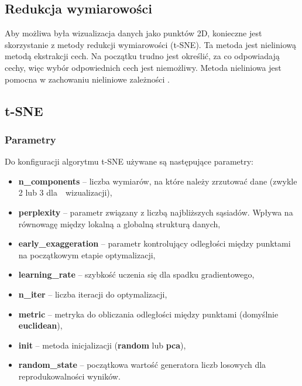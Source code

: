 	\subsection{Redukcja wymiarowości}
		Aby możliwa była wizualizacja danych jako punktów 2D, konieczne jest skorzystanie z metody redukcji wymiarowości (t-SNE). Ta metoda jest nieliniową metodą ekstrakcji cech. Na początku trudno jest określić, za co odpowiadają cechy, więc wybór odpowiednich cech jest niemożliwy. Metoda nieliniowa jest pomocna w  zachowaniu nieliniowe zależności \cite{t-sne}.
	
		
	\subsection{t-SNE}
	
		\subsubsection{Parametry}
			Do konfiguracji algorytmu t-SNE używane są następujące parametry:
			\begin{itemize}
				\item \textbf{n\_components} -- liczba wymiarów, na które należy zrzutować dane (zwykle 2 lub 3 dla~~wizualizacji),
				\item \textbf{perplexity} -- parametr związany z liczbą najbliższych sąsiadów. Wpływa na równowagę między lokalną a globalną strukturą danych,
				\item \textbf{early\_exaggeration} -- parametr kontrolujący odległości między punktami na początkowym etapie optymalizacji,
				\item \textbf{learning\_rate} -- szybkość uczenia się dla spadku gradientowego,
				\item \textbf{n\_iter} -- liczba iteracji do optymalizacji,
				\item \textbf{metric} -- metryka do obliczania odległości między punktami (domyślnie \textbf{euclidean}),
				\item \textbf{init} -- metoda inicjalizacji (\textbf{random} lub \textbf{pca}),
				\item \textbf{random\_state} -- początkowa wartość generatora liczb losowych dla reprodukowalności wyników.
			\end{itemize}				
		
